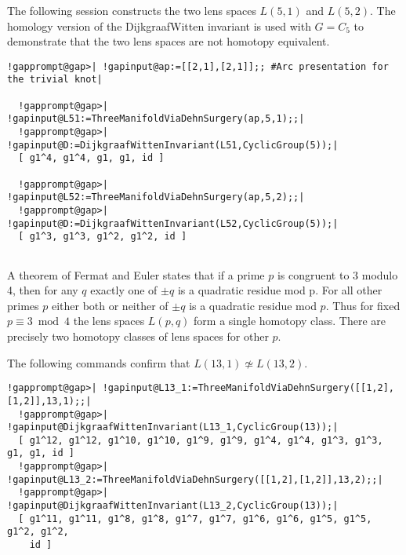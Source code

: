 \documentclass[a4paper,11pt]{report}
\begin{document}
{{ The following session constructs the two lens spaces $L(5,1)$ and $L(5,2)$. The homology version of the Dijkgraaf\texttt{}Witten invariant is
used with $G=C_5$ to demonstrate that the two lens spaces are not homotopy equivalent. 
\begin{Verbatim}[commandchars=!@|,fontsize=\small,frame=single,label=Example]
  !gapprompt@gap>| !gapinput@ap:=[[2,1],[2,1]];; #Arc presentation for the trivial knot|
  
  !gapprompt@gap>| !gapinput@L51:=ThreeManifoldViaDehnSurgery(ap,5,1);;|
  !gapprompt@gap>| !gapinput@D:=DijkgraafWittenInvariant(L51,CyclicGroup(5));|
  [ g1^4, g1^4, g1, g1, id ]
  
  !gapprompt@gap>| !gapinput@L52:=ThreeManifoldViaDehnSurgery(ap,5,2);;|
  !gapprompt@gap>| !gapinput@D:=DijkgraafWittenInvariant(L52,CyclicGroup(5));|
  [ g1^3, g1^3, g1^2, g1^2, id ]
  
\end{Verbatim}
 A theorem of Fermat and Euler states that if a prime $p$ is congruent to 3 modulo 4, then for any $q$ exactly one of $\pm q$ is a quadratic residue mod p. For all other primes $p$ either both or neither of $\pm q$ is a quadratic residue mod $p$. Thus for fixed $p \equiv 3 \bmod 4$ the lens spaces $L(p,q)$ form a single homotopy class. There are precisely two homotopy classes of lens
spaces for other $p$. 

 The following commands confirm that $L(13,1) \not\simeq L(13,2)$. 
\begin{Verbatim}[commandchars=!@|,fontsize=\small,frame=single,label=Example]
  !gapprompt@gap>| !gapinput@L13_1:=ThreeManifoldViaDehnSurgery([[1,2],[1,2]],13,1);;|
  !gapprompt@gap>| !gapinput@DijkgraafWittenInvariant(L13_1,CyclicGroup(13));|
  [ g1^12, g1^12, g1^10, g1^10, g1^9, g1^9, g1^4, g1^4, g1^3, g1^3, g1, g1, id ]
  !gapprompt@gap>| !gapinput@L13_2:=ThreeManifoldViaDehnSurgery([[1,2],[1,2]],13,2);;|
  !gapprompt@gap>| !gapinput@DijkgraafWittenInvariant(L13_2,CyclicGroup(13));|
  [ g1^11, g1^11, g1^8, g1^8, g1^7, g1^7, g1^6, g1^6, g1^5, g1^5, g1^2, g1^2, 
    id ]
  
\end{Verbatim}
 }

 
}
\end{document}
